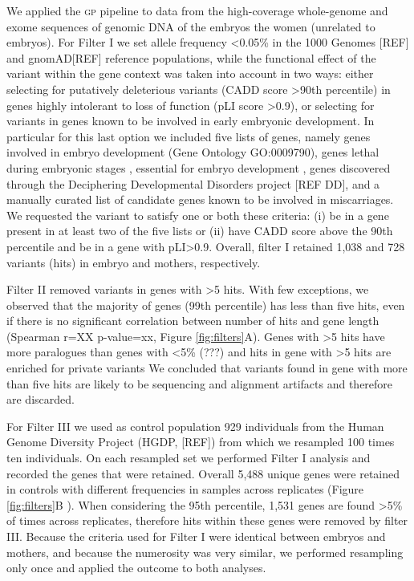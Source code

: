 \documentclass[fleqn,10pt]{wlscirep}
\newcommand{\gp}[]{\textsc{gp }}
\begin{document}

We applied the \gp pipeline to data from the high-coverage whole-genome and exome sequences of genomic DNA of the embryos the women (unrelated to embryos). For Filter I we set allele frequency <0.05\% in the 1000 Genomes [REF] and gnomAD[REF] reference populations, while the functional effect of the variant within the gene context was taken into account in two ways: either selecting for putatively deleterious variants (CADD score >90th percentile) in genes highly intolerant to loss of function (pLI score >0.9), or selecting for variants in genes known to be involved in early embryonic development. In particular for this last option we included five lists of genes, namely genes involved in embryo development (Gene Ontology GO:0009790), genes lethal during embryonic stages \cite{dawes2019gene}, essential for embryo development \cite{dawes2019gene}, genes discovered through the Deciphering Developmental Disorders project [REF DD], and a manually curated list of candidate genes known to be involved in miscarriages. We requested the variant to satisfy one or both these criteria: (i) be in a gene present in at least two of the five lists or (ii) have CADD score above the 90th percentile and be in a gene with pLI>0.9. Overall, filter I retained 1,038 and 728 variants (hits) in embryo and mothers, respectively.   

Filter II removed variants in genes with >5 hits. With few exceptions, we observed that the majority of genes (99th percentile) has less than five hits, even if there is no significant correlation between number of hits and gene length (Spearman r=XX p-value=xx, Figure \ref{fig:filters}A). Genes with >5 hits have more paralogues than genes with <5\% (???) and hits in gene with >5 hits are enriched for private variants  We concluded that variants found in gene with more than five hits are likely to be sequencing and alignment artifacts and therefore are discarded. 

For Filter III we used as control population 929 individuals from the Human Genome Diversity Project (HGDP, [REF]) from which we resampled 100 times ten individuals. On each resampled set we performed Filter I analysis and recorded the genes that were retained. Overall 5,488 unique genes were retained in controls with different frequencies in samples across replicates (Figure \ref{fig:filters}B ). When considering the 95th percentile, 1,531 genes are found >5\% of times across replicates, therefore hits within these genes were removed by filter III. Because the criteria used for Filter I were identical between embryos and mothers, and because the numerosity was very similar, we performed resampling only once and applied the outcome to both analyses.
\end{document}

